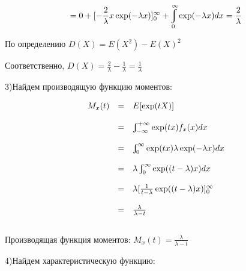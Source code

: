 \documentclass[a4paper,12pt, oneside]{article}
\let\int\varint
\begin{document}
	$$
	= 0 + [-\frac{2}{\lambda} x \exp(-\lambda x)]_0^\infty + \int_0^\infty \exp(-\lambda x)dx = \frac{2}{\lambda}
	$$
	
	По определению $D(X) = E(X^2) - E(X)^2$
	
	Соответственно, $D(X) = \frac{2}{\lambda} - \frac{1}{\lambda} = \frac{1}{\lambda}$ 
	
	\vspace{\baselineskip}
	3)Найдем производящую функцию моментов:
	
	$$
	\begin{array}{rcl}
	M_x(t) &=& E[\exp(tX)] \\
	\\
	&=& \int_{-\infty}^{+\infty} \exp(tx) f_x(x)dx \\
	\\
	&=& \int_0^\infty \exp(tx) \lambda \exp(-\lambda x)dx\\
	\\
	&=& \lambda \int_0^\infty \exp((t-\lambda) x)dx\\
	\\
	&=&\lambda[\frac{1}{t-\lambda} \exp((t-\lambda) x)]_0^\infty\\
	\\
	&=&\frac{\lambda}{\lambda-t}
	\end{array}
	$$
	\\
	Производящая функция моментов: $M_x(t) = \frac{\lambda}{\lambda-t}$
	
	\vspace{\baselineskip}
	4)Найдем характеристическую функцию:
	
\end{document}
